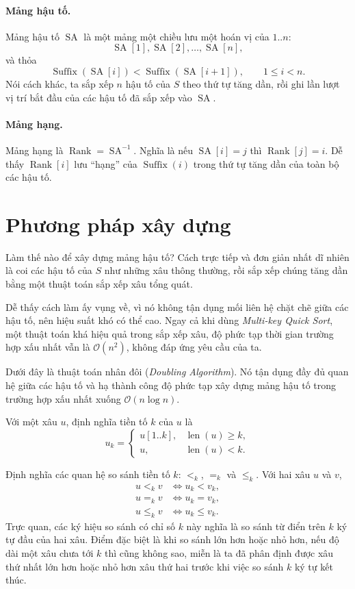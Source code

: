 \documentclass[11pt]{article}
\newcommand{\Oh}{\mathcal{O}}
\newcommand{\SA}{\operatorname{SA}}
\newcommand{\Rank}{\operatorname{Rank}}
\newcommand{\Suf}{\operatorname{Suffix}}
\newcommand{\Len}{\operatorname{len}}
\begin{document}
\paragraph{Mảng hậu tố.}
Mảng hậu tố \(\SA\) là một mảng một chiều lưu một hoán vị của \(1..n\):
\[
  \SA[1],\SA[2],\ldots,\SA[n],
\]
và thỏa
\[
  \Suf(\SA[i])<\Suf(\SA[i+1]),\qquad 1\le i<n.
\]
Nói cách khác, ta sắp xếp \(n\) hậu tố của \(S\) theo thứ tự tăng dần, rồi
ghi lần lượt vị trí bắt đầu của các hậu tố đã sắp xếp vào \(\SA\).

\paragraph{Mảng hạng.}
Mảng hạng là \(\Rank=\SA^{-1}\). Nghĩa là nếu \(\SA[i]=j\) thì
\(\Rank[j]=i\). Dễ thấy \(\Rank[i]\) lưu ``hạng'' của \(\Suf(i)\) trong thứ
tự tăng dần của toàn bộ các hậu tố.

\section{Phương pháp xây dựng}

Làm thế nào để xây dựng mảng hậu tố? Cách trực tiếp và đơn giản nhất dĩ
nhiên là coi các hậu tố của \(S\) như những xâu thông thường, rồi sắp xếp
chúng tăng dần bằng một thuật toán sắp xếp xâu tổng quát.

Dễ thấy cách làm ấy vụng về, vì nó không tận dụng mối liên hệ chặt chẽ giữa
các hậu tố, nên hiệu suất khó có thể cao. Ngay cả khi dùng \textit{Multi-key
Quick Sort}, một thuật toán khá hiệu quả trong sắp xếp xâu, độ phức tạp thời
gian trường hợp xấu nhất vẫn là \(\Oh(n^2)\), không đáp ứng yêu cầu của ta.

Dưới đây là thuật toán nhân đôi (\textit{Doubling Algorithm}). Nó tận dụng
đầy đủ quan hệ giữa các hậu tố và hạ thành công độ phức tạp xây dựng mảng hậu
tố trong trường hợp xấu nhất xuống \(\Oh(n\log n)\).

Với một xâu \(u\), định nghĩa tiền tố \(k\) của \(u\) là
\[
  u_k=
  \begin{cases}
    u[1..k], & \Len(u)\ge k,\\
    u, & \Len(u)<k.
  \end{cases}
\]

Định nghĩa các quan hệ so sánh tiền tố \(k\): \(<_k\), \(=_k\) và \(\le_k\).
Với hai xâu \(u\) và \(v\),
\[
\begin{aligned}
  u <_k v &\Longleftrightarrow u_k < v_k,\\
  u =_k v &\Longleftrightarrow u_k = v_k,\\
  u \le_k v &\Longleftrightarrow u_k \le v_k.
\end{aligned}
\]
Trực quan, các ký hiệu so sánh có chỉ số \(k\) này nghĩa là so sánh từ điển
trên \(k\) ký tự đầu của hai xâu. Điểm đặc biệt là khi so sánh lớn hơn hoặc
nhỏ hơn, nếu độ dài một xâu chưa tới \(k\) thì cũng không sao, miễn là ta đã
phân định được xâu thứ nhất lớn hơn hoặc nhỏ hơn xâu thứ hai trước khi việc
so sánh \(k\) ký tự kết thúc.
\end{document}
